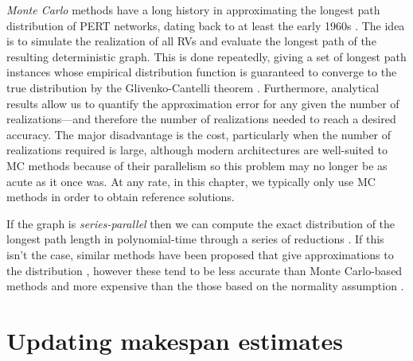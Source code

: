 \documentclass[12pt]{article}
\begin{document}

{\em Monte Carlo} methods have a long history in approximating the longest path distribution of PERT networks, dating back to at least the early 1960s \cite{van63}. The idea is to simulate the realization of all RVs and evaluate the longest path of the resulting deterministic graph. This is done repeatedly, giving a set of longest path instances whose empirical distribution function is guaranteed to converge to the true distribution by the Glivenko-Cantelli theorem \cite{can16}. Furthermore, analytical results allow us to quantify the approximation error for any given the number of realizations---and therefore the number of realizations needed to reach a desired accuracy. The major disadvantage is the cost, particularly when the number of realizations required is large, although modern architectures are well-suited to MC methods because of their parallelism so this problem may no longer be as acute as it once was. At any rate, in this chapter, we typically only use MC methods in order to obtain reference solutions.

If the graph is {\em series-parallel} then we can compute the exact distribution of the longest path length in polynomial-time through a series of reductions \cite{dod85,mar65}. If this isn't the case, similar methods have been proposed that give approximations to the distribution \cite{dod85,lud01}, however these tend to be less accurate than Monte Carlo-based methods and more expensive than the those based on the normality assumption \cite{can16}. 


\section{Updating makespan estimates}
\label{sect.updating}

\end{document}
